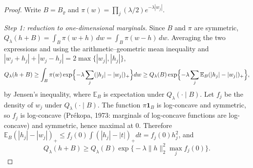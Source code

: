 \documentclass[11pt]{article}
\theoremstyle{definition}
\theoremstyle{remark}
\newcommand{\E}{\mathbb{E}}
\newcommand{\Ql}{Q_\lambda}
\newcommand{\ind}{\mathbf 1}
\begin{document}
\begin{proof}
Write $B=B_\varrho$ and $\pi(w)=\prod_j(\lambda/2)e^{-\lambda|w_j|}$.

\emph{Step 1: reduction to one-dimensional marginals.} Since $B$ and $\pi$ are symmetric, $\Ql(h+B)=\int_B\pi(w+h)\,dw=\int_B\pi(w-h)\,dw$. Averaging the two expressions and using the arithmetic--geometric mean inequality and $|w_j+h_j|+|w_j-h_j|=2\max\{|w_j|,|h_j|\}$,
\[
\Ql(h+B)\ge\int_B\pi(w)\exp\Bigl\{-\lambda\sum_j(|h_j|-|w_j|)_+\Bigr\}dw\ge\Ql(B)\exp\Bigl\{-\lambda\sum_j\E_B(|h_j|-|w_j|)_+\Bigr\},
\]
by Jensen's inequality, where $\E_B$ is expectation under $\Ql(\cdot\mid B)$. Let $f_j$ be the density of $w_j$ under $\Ql(\cdot\mid B)$. The function $\pi\ind_B$ is log-concave and symmetric, so $f_j$ is log-concave (Pr\'ekopa, 1973: marginals of log-concave functions are log-concave) and symmetric, hence maximal at $0$. Therefore $\E_B(|h_j|-|w_j|)_+\le f_j(0)\int(|h_j|-|t|)_+dt=f_j(0)h_j^2$, and
\begin{equation}\label{eq:qs1}
\Ql(h+B)\ge\Ql(B)\exp\bigl\{-\lambda\|h\|_2^2\max_jf_j(0)\bigr\}.
\end{equation}


\end{proof}
\end{document}
